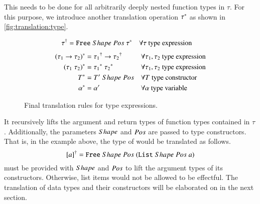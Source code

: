 This needs to be done for all arbitrarily deeply nested function types in $\tau$.
For this purpose, we introduce another translation operation ${\tau}^{*}$ as shown in \autoref{fig:translation:type}.
\begin{figure}[H]
  \begin{align}
       {\tau}^{\dagger}
    &= {\texttt{Free}}\;Shape\;Pos\;{{\tau}^{*}}
    && \forall \tau \text{ type expression}
       \label{eqn:translation:type}
  \end{align}
  \begin{align}
       {(\tau_1 \rightarrow \tau_2)}^{*}
    &= {\tau_1}^{\dagger} \rightarrow {\tau_2}^{\dagger}
    && \forall \tau_1, \tau_2 \text{ type expression}
       \label{eqn:translation:type:function}
    \\
       {(\tau_1\;\tau_2)}^{*}
    &= {\tau_1}^{*}\;{\tau_2}^{*}
    && \forall \tau_1, \tau_2 \text{ type expression}
       \label{eqn:translation:type:application}
    \\
       {T}^{*}
    &= {T'}\;Shape\;Pos
    && \forall T \text{ type constructor}
       \label{eqn:translation:type:constructor}
    \\
    {\alpha}^{*}
    &= \alpha'
    && \forall \alpha \text{ type variable}
       \label{eqn:translation:type:variable}
  \end{align}
  \caption{Final translation rules for type expressions.}
  \label{fig:translation:type}
\end{figure}

It recursively lifts the argument and return types of function types contained in $\tau$.
Additionally, the parameters $Shape$ and $Pos$ are passed to type constructors.
That is, in the example above, the type of  would be translated as follows.
\[
  {[a]}^{\dagger} = {\texttt{Free}}\;Shape\;Pos\;{({\texttt{List}}\;Shape\;Pos\;a)}
\]
 must be provided with $Shape$ and $Pos$ to lift the argument types of its constructors.
Otherwise, list items would not be allowed to be effectful.
The translation of data types and their constructors will be elaborated on in the next section.
